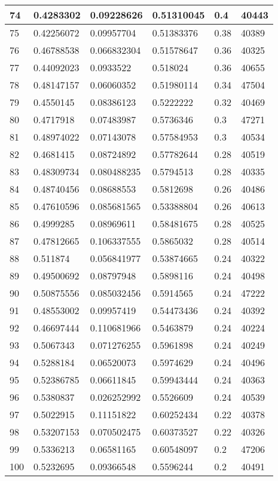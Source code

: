 \begin{longtable}{|l|l|l|l|l|l|}
74 & 0.4283302 & 0.09228626 & 0.51310045 & 0.4 & 40443 \\ \hline 
75 & 0.42256072 & 0.09957704 & 0.51383376 & 0.38 & 40389 \\ \hline 
76 & 0.46788538 & 0.066832304 & 0.51578647 & 0.36 & 40325 \\ \hline 
77 & 0.44092023 & 0.0933522 & 0.518024 & 0.36 & 40655 \\ \hline 
78 & 0.48147157 & 0.06060352 & 0.51980114 & 0.34 & 47504 \\ \hline 
79 & 0.4550145 & 0.08386123 & 0.5222222 & 0.32 & 40469 \\ \hline 
80 & 0.4717918 & 0.07483987 & 0.5736346 & 0.3 & 47271 \\ \hline 
81 & 0.48974022 & 0.07143078 & 0.57584953 & 0.3 & 40534 \\ \hline 
82 & 0.4681415 & 0.08724892 & 0.57782644 & 0.28 & 40519 \\ \hline 
83 & 0.48309734 & 0.080488235 & 0.5794513 & 0.28 & 40335 \\ \hline 
84 & 0.48740456 & 0.08688553 & 0.5812698 & 0.26 & 40486 \\ \hline 
85 & 0.47610596 & 0.085681565 & 0.53388804 & 0.26 & 40613 \\ \hline 
86 & 0.4999285 & 0.08969611 & 0.58481675 & 0.28 & 40525 \\ \hline 
87 & 0.47812665 & 0.106337555 & 0.5865032 & 0.28 & 40514 \\ \hline 
88 & 0.511874 & 0.056841977 & 0.53874665 & 0.24 & 40322 \\ \hline 
89 & 0.49500692 & 0.08797948 & 0.5898116 & 0.24 & 40498 \\ \hline 
90 & 0.50875556 & 0.085032456 & 0.5914565 & 0.24 & 47222 \\ \hline 
91 & 0.48553002 & 0.09957419 & 0.54473436 & 0.24 & 40392 \\ \hline 
92 & 0.46697444 & 0.110681966 & 0.5463879 & 0.24 & 40224 \\ \hline 
93 & 0.5067343 & 0.071276255 & 0.5961898 & 0.24 & 40249 \\ \hline 
94 & 0.5288184 & 0.06520073 & 0.5974629 & 0.24 & 40496 \\ \hline 
95 & 0.52386785 & 0.06611845 & 0.59943444 & 0.24 & 40363 \\ \hline 
96 & 0.5380837 & 0.026252992 & 0.5526609 & 0.24 & 40539 \\ \hline 
97 & 0.5022915 & 0.11151822 & 0.60252434 & 0.22 & 40378 \\ \hline 
98 & 0.53207153 & 0.070502475 & 0.60373527 & 0.22 & 40326 \\ \hline 
99 & 0.5336213 & 0.06581165 & 0.60548097 & 0.2 & 47206 \\ \hline 
100 & 0.5232695 & 0.09366548 & 0.5596244 & 0.2 & 40491 \\ \hline 
\end{longtable}